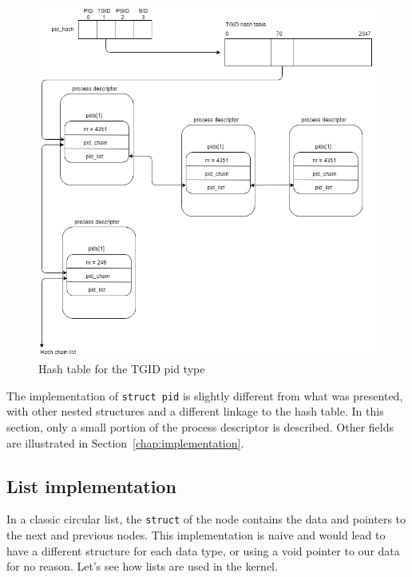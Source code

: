 \begin{figure}[ht]
\includegraphics[width=\textwidth]{images/pidhash2}
\caption{Hash table for the TGID pid type}
\label{img:pidhash2}
\end{figure}
The implementation of \verb|struct pid| is slightly different from what was presented, with other nested structures and a different linkage to the hash table. %
In this section, only a small portion of the process descriptor is described. Other fields are illustrated in Section~\ref{chap:implementation}.



\subsection{List implementation}
In a classic circular list, the \texttt{struct} of the node contains the data and pointers to the next and previous nodes. This implementation is naive and would lead to have a different structure for each data type, or using a void pointer to our data for no reason. Let's see how lists are used in the kernel.
\\%

